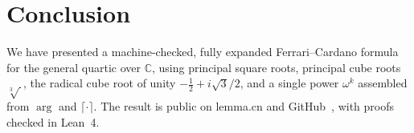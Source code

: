 \documentclass[11pt,a4paper]{article}
\newcommand{\C}{\mathbb{C}}
\newcommand{\Arg}{\operatorname{arg}}
\begin{document}
\section{Conclusion}
\label{sec:conclusion}

We have presented a machine-checked, fully expanded Ferrari--Cardano formula for the general quartic over \(\C\), using principal square roots, principal cube roots \(\sqrt[3]{\,}\), the radical cube root of unity \(-\tfrac12+i\sqrt{3}/2\), and a single power \(\omega^{k}\) assembled from \(\Arg\) and \(\lceil\cdot\rceil\).
The result is public on lemma.cn and GitHub~\cite{lemma_repo}, with proofs checked in Lean~4.



\end{document}
